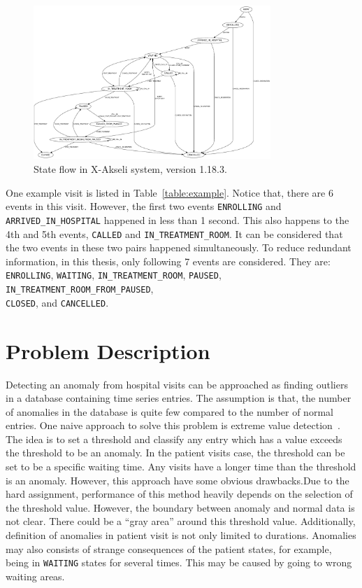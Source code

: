 \begin{figure}
	\begin{center}
		\includegraphics[width=0.8\textwidth]{images/patientFsm}
		\caption{State flow in X-Akseli system, version 1.18.3.}
		\label{fig:state}
	\end{center}
\end{figure}

One example visit is listed in Table~\ref{table:example}. Notice that, there are 6 events in this visit. However, the first two events \texttt{ENROLLING} and  \texttt{ARRIVED\_IN\_HOSPITAL} happened in less than 1 second. This also happens to the 4th and 5th events, \texttt{CALLED} and \texttt{IN\_TREATMENT\_ROOM}. It can be considered that the two events in these two pairs happened simultaneously. To reduce redundant information, in this thesis, only following 7 events are considered. They are: \texttt{ENROLLING}, \texttt{WAITING}, \texttt{IN\_TREATMENT\_ROOM}, \texttt{PAUSED}, \texttt{IN\_TREATMENT\_ROOM\_FROM\_PAUSED}, \\ \texttt{CLOSED}, and \texttt{CANCELLED}.

\section{Problem Description}
Detecting an anomaly from hospital visits can be approached as finding outliers in a database containing time series entries. The assumption is that, the number of anomalies in the database is quite few compared to the number of normal entries. One naive approach to solve this problem is extreme value detection~\cite{aggarwal2013introduction}. The idea is to set a threshold and classify any entry which has a value exceeds the threshold to be an anomaly. In the patient visits case, the threshold can be set to be a specific waiting time. Any visits have a longer time than the threshold is an anomaly. However, this approach have some obvious drawbacks.Due to the hard assignment, performance of this method heavily depends on the selection of the threshold value. However, the boundary between anomaly and normal data is not clear. There could be a ``gray area'' around this threshold value. Additionally, definition of anomalies in patient visit is not only limited to durations. Anomalies may also consists of strange consequences of the patient states, for example, being in \texttt{WAITING} states for several times. This may be caused by going to wrong waiting areas.

